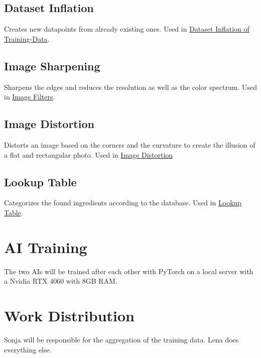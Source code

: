 \documentclass[a4paper,11pt]{report}
\begin{document}
            \subsection{Dataset Inflation}
                Creates new datapoints from already existing ones. Used in \hyperref[subsec:data:inflation]{Dataset Inflation of Training-Data}.

            \subsection{Image Sharpening}
                Sharpens the edges and reduces the resolution as well as the color spectrum. Used in \hyperref[subsec:architecture:filters]{Image Filters}.

            \subsection{Image Distortion}
                Distorts an image based on the corners and the curvature to create the illusion of a flat and rectangular photo. Used in \hyperref[subsec:architecture:distortion]{Image Distortion}

            \subsection{Lookup Table}
                Categorizes the found ingredients according to the database. Used in \hyperref[subsec:architecture:table]{Lookup Table}.

        \section{AI Training}
            The two AIs will be trained after each other with PyTorch \cite{pytorch} on a local server with a Nvidia RTX 4060 with 8GB RAM.

        \section{Work Distribution}
            Sonja will be responsible for the aggregation of the training data. Lena does everything else.



    \printbibliography
\end{document}
